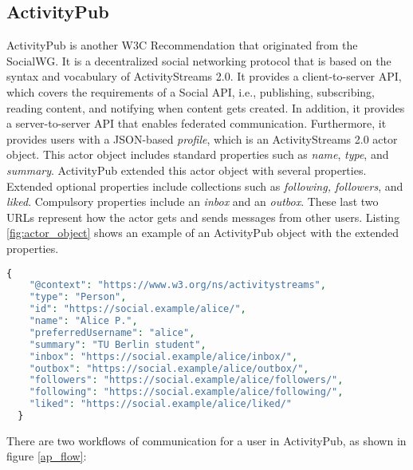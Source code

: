 \subsection{ActivityPub}\label{subsec:activitypub}

ActivityPub is another W3C Recommendation that originated from the SocialWG. It is a decentralized social networking protocol that is based on the syntax and vocabulary of ActivityStreams 2.0. It provides a client-to-server API, which covers the requirements of a Social API\cite{guy_2017}, i.e., publishing, subscribing, reading content, and notifying when content gets created. In addition, it provides a server-to-server API that enables federated communication. Furthermore, it provides users with a JSON-based \emph{profile}, which is an ActivityStreams 2.0 actor object. This actor object includes standard properties such as \emph{name}, \emph{type}, and \emph{summary}. ActivityPub extended this actor object with several properties. Extended optional properties include collections such as \emph{following, followers}, and \emph{liked}. Compulsory properties include an \emph{inbox} and an \emph{outbox}. These last two URLs represent how the actor gets and sends messages from other users. Listing \ref{fig:actor_object} shows an example of an ActivityPub object with the extended properties. 


\lstset{style=JSONStyle}
\begin{lstlisting}[language=PHP, caption=Actor object example in ActivityPub \cite{lemmer-webber_tallon_guy_prodromou_2018}, label=fig:actor_object, float=h!]
  {
    "@context": "https://www.w3.org/ns/activitystreams",
    "type": "Person",
    "id": "https://social.example/alice/",
    "name": "Alice P.",
    "preferredUsername": "alice",
    "summary": "TU Berlin student",
    "inbox": "https://social.example/alice/inbox/",
    "outbox": "https://social.example/alice/outbox/",
    "followers": "https://social.example/alice/followers/",
    "following": "https://social.example/alice/following/",
    "liked": "https://social.example/alice/liked/"
  }
\end{lstlisting}

There are two workflows of communication for a user in ActivityPub, as shown in figure \ref{ap_flow}: \label{subsec:ap_workflows}

